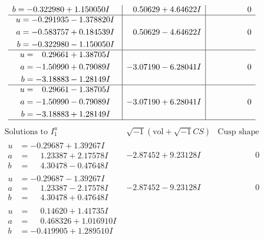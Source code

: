 \documentclass[1p]{elsarticle_modified}
\theoremstyle{definition}
\newcommand{\I}{\sqrt{-1}}
\begin{document}
$$\begin{array}{c|c|c}
\begin{aligned}
b &= -0.322980 + 1.150050 I\end{aligned}
 & \phantom{-}0.50629 + 4.64622 I & \phantom{-0.000000 } 0 \\ \hline\begin{aligned}
u &= -0.291935 - 1.378820 I \\
a &= -0.583757 + 0.184539 I \\
b &= -0.322980 - 1.150050 I\end{aligned}
 & \phantom{-}0.50629 - 4.64622 I & \phantom{-0.000000 } 0 \\ \hline\begin{aligned}
u &= \phantom{-}0.29661 + 1.38705 I \\
a &= -1.50990 + 0.79089 I \\
b &= -3.18883 - 1.28149 I\end{aligned}
 & -3.07190 - 6.28041 I & \phantom{-0.000000 } 0 \\ \hline\begin{aligned}
u &= \phantom{-}0.29661 - 1.38705 I \\
a &= -1.50990 - 0.79089 I \\
b &= -3.18883 + 1.28149 I\end{aligned}
 & -3.07190 + 6.28041 I & \phantom{-0.000000 } 0\\
 \hline 
 \end{array}$$\newpage$$\begin{array}{c|c|c}  
\text{Solutions to }I^u_{1}& \I (\text{vol} + \sqrt{-1}CS) & \text{Cusp shape}\\
 \hline 
\begin{aligned}
u &= -0.29687 + 1.39267 I \\
a &= \phantom{-}1.23387 + 2.17578 I \\
b &= \phantom{-}4.30478 - 0.47648 I\end{aligned}
 & -2.87452 + 9.23128 I & \phantom{-0.000000 } 0 \\ \hline\begin{aligned}
u &= -0.29687 - 1.39267 I \\
a &= \phantom{-}1.23387 - 2.17578 I \\
b &= \phantom{-}4.30478 + 0.47648 I\end{aligned}
 & -2.87452 - 9.23128 I & \phantom{-0.000000 } 0 \\ \hline\begin{aligned}
u &= \phantom{-}0.14620 + 1.41735 I \\
a &= \phantom{-}0.468326 + 1.016910 I \\
b &= -0.419905 + 1.289510 I\end{aligned}

\end{array}$$
\end{document}
